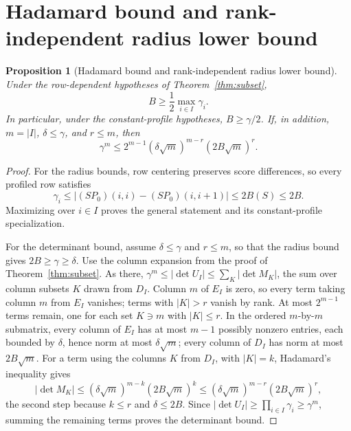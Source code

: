 \documentclass[10pt]{article} %
\newtheorem{proposition}[theorem]{Proposition}
\theoremstyle{definition}
\begin{document}
\section{Hadamard bound and rank-independent radius lower bound}
\label{app:hadamard}

\begin{proposition}[Hadamard bound and rank-independent radius lower bound]\label{prop:hadamard}
Under the row-dependent hypotheses of Theorem~\ref{thm:subset},
\[
 B\ge\frac12\max_{i\in I}\gamma_i .
\]
In particular, under the constant-profile hypotheses, \(B\ge\gamma/2\).
If, in addition, \(m=|I|\), \(\delta\le\gamma\), and \(r\le m\), then
\[
 \gamma^m\le
 2^{m-1}(\delta\sqrt m)^{m-r}(2B\sqrt m)^r .
\]
\end{proposition}

\begin{proof}
For the radius bounds, row centering preserves score differences, so
every profiled row satisfies
\[
 \gamma_i\le |(SP_0)(i,i)-(SP_0)(i,i+1)|\le2B(S)\le2B .
\]
Maximizing over \(i\in I\) proves the general statement and its
constant-profile specialization.

For the determinant bound, assume \(\delta\le\gamma\) and \(r\le m\),
so that the radius bound gives \(2B\ge\gamma\ge\delta\).  Use the column
expansion from the proof of Theorem~\ref{thm:subset}.  As there,
\(\gamma^m\le|\det U_I|\le\sum_K|\det M_K|\), the sum over column
subsets \(K\) drawn from \(D_I\).  Column \(m\) of
\(E_I\) is zero, so every term taking column \(m\) from \(E_I\)
vanishes; terms with \(|K|>r\) vanish by rank.  At most \(2^{m-1}\)
terms remain, one for each set \(K\ni m\) with \(|K|\le r\).  In the
ordered \(m\)-by-\(m\) submatrix, every column of \(E_I\) has at most
\(m-1\) possibly nonzero entries, each bounded by \(\delta\), hence
norm at most \(\delta\sqrt m\); every column of \(D_I\) has norm at
most \(2B\sqrt m\).  For a term using the columns \(K\) from \(D_I\),
with \(|K|=k\), Hadamard's inequality gives
\[
 |\det M_K|
 \le(\delta\sqrt m)^{m-k}(2B\sqrt m)^{k}
 \le(\delta\sqrt m)^{m-r}(2B\sqrt m)^{r},
\]
the second step because \(k\le r\) and \(\delta\le2B\).  Since
\(|\det U_I|\ge\prod_{i\in I}\gamma_i\ge\gamma^m\), summing the
remaining terms proves the determinant bound.
\end{proof}
\end{document}
